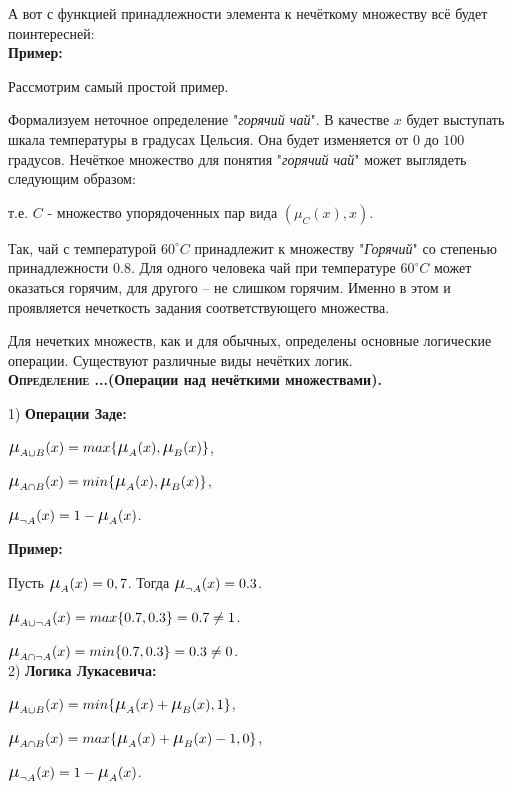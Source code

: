 \documentclass[18pt, a4paper]{extarticle}
\newcounter{par}
\newcounter{spar}
\newcounter{zap}
\newcommand{\oprT}[1]{\textbf{\textsc{Определение \thepar.\if\thespar1\thespar.\fi\thezap.}(#1).}\stepcounter{zap}}
\newcommand{\primer}{\textbf{Пример:\;}}
\newcommand{\bigs}[1]{\scalebox{1.3}{$#1$}}
\newcommand{\chf}{\bigs\mu}
\begin{document}
А вот с функцией принадлежности элемента к нечёткому множеству всё будет поинтересней:\\

\primer

Рассмотрим самый простой пример.

Формализуем неточное определение "\textit{горячий чай}"{}. В качестве $x$ будет выступать шкала температуры в градусах Цельсия. Она будет изменяется от $0$ до $100$ градусов. Нечёткое множество для понятия "\textit{горячий чай}"{} может выглядеть следующим образом:

\begin{center}
\end{center}

т.е. $C$ - множество упорядоченных пар вида $(\mu_C(x),x)$.

Так, чай с температурой $60^{\circ}C$ принадлежит к множеству "\textit{Горячий}"{} со степенью принадлежности 0.8. Для одного человека чай при температуре $60^{\circ}C$ может оказаться горячим, для другого – не слишком горячим. Именно в этом и проявляется нечеткость задания соответствующего множества.

Для нечетких множеств, как и для обычных, определены основные логические операции. Существуют различные виды нечётких логик.\\

\oprT{Операции над нечёткими множествами}

1) \textbf{Операции Заде:} 

$\chf_{A\cup B}(x)=max\{\chf_A(x),\chf_B(x)\}$,

$\chf_{A\cap B}(x)=min\{\chf_A(x),\chf_B(x)\}$,

$\chf_{\lnot A}(x)=1-\chf_A(x)$.\newpage

\primer

Пусть $\chf_A(x)=0,7$. Тогда  $\chf_{\lnot A}(x)=0.3$.

$\chf_{A\cup\lnot A}(x)=max\{0.7,0.3\}=0.7\neq 1$.

$\chf_{A\cap\lnot A}(x)=min\{0.7,0.3\}=0.3\neq 0$.\\

2) \textbf{Логика Лукасевича:}

$\chf_{A\cup B}(x)=min\{\chf_A(x)+\chf_B(x),1\}$,

$\chf_{A\cap B}(x)=max\{\chf_A(x)+\chf_B(x)-1,0\}$,

$\chf_{\lnot A}(x)=1-\chf_A(x)$.\\
\end{document}

